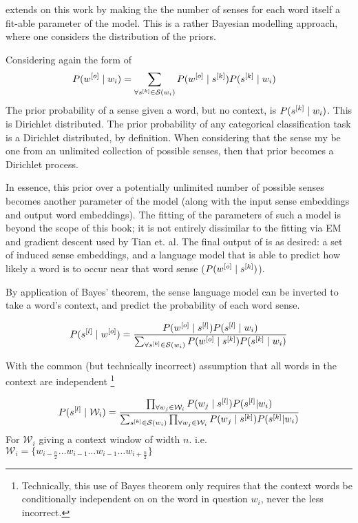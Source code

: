 \documentclass[12pt,parskip]{komatufte}
\begin{document}
 extends on this work by making the the number of senses for each word itself a fit-able parameter of the model.
This is a rather Bayesian modelling approach, where one considers the distribution of the priors.

Considering again the form of 
\begin{align}
P(\n w_o\mid w_i) &= \sum_{\forall \n s_k \in \seq S(w_i)} P(\n w_o \mid \n s_k) P(\n s_k \mid w_i) 
\end{align}
The prior probability of a sense given a word, but no context, is 
$P(\n s_k \mid w_i)$.
This is Dirichlet distributed.
The prior probability of any categorical classification task is a Dirichlet distributed, by  definition.
When considering that the sense my be one from an unlimited collection of possible senses,
then that prior becomes a Dirichlet process.

In essence, this prior over a potentially unlimited number of possible senses becomes another parameter of the model (along with the input sense embeddings and output word embeddings).
The fitting of the parameters of such a model is beyond the scope of this book;
it is not entirely dissimilar to the fitting via EM and gradient descent used by Tian et. al.
The final output of  is as desired:
a set of induced sense embeddings, 
and a language model that is able to predict how likely a word is to occur near that word sense ($P(\n w_o \mid \n s_k)$).

By application of Bayes' theorem, the sense language model can be inverted to take a word's context,
and predict the probability of each word sense.

\begin{equation}
P(\n s_l \mid \n w_o) = \frac{P(\n w_o \mid \n s_l) P(\n s_l \mid w_i)}{\sum_{\forall \n s_k \in \seq S(w_i)} P(\n w_o \mid \n s_k) P(\n s_k \mid w_i)}
\end{equation}

With the common (but technically incorrect) assumption that all words in the context are independent \footnote{Technically, this use of Bayes theorem only requires that the context words be conditionally independent on on the word in question $w_i$, never the less incorrect.}

\begin{equation}
P(\n s_l \mid \mathcal{W}_i) = 
\frac{\prod_{\forall w_{j}\in \mathcal{W}_i} P(w_{j} \mid \n s_l) P(\n s_l | w_i)}{\sum_{\n s_k \in \seq S(w_i)} \prod_{\forall w_{j} \in \mathcal{W}_i} P(w_{j} \mid \n s_k) P(\n s_k | w_i)}
\end{equation}
For $\mathcal{W}_i$ giving a context window of width $n$. i.e. $\mathcal{W}_i = \lbrace w_{i-\frac{n}{2}} \ldots w_{i-1} \ldots w_{i-1} \dots w_{i+\frac{n}{2}} \rbrace$
\end{document}
